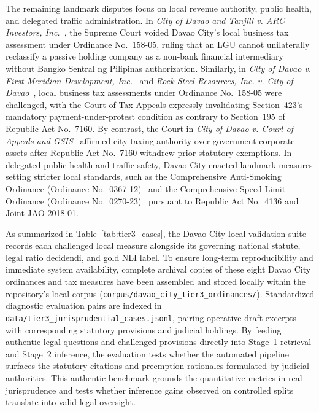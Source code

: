     The remaining landmark disputes focus on local revenue authority, public health, and delegated traffic administration. In \textit{City of Davao and Tanjili v. ARC Investors, Inc.}~\cite{scp2022davaovarc}, the Supreme Court voided Davao City's local business tax assessment under Ordinance No.~158-05, ruling that an LGU cannot unilaterally reclassify a passive holding company as a non-bank financial intermediary without Bangko Sentral ng Pilipinas authorization. Similarly, in \textit{City of Davao v. First Meridian Development, Inc.}~\cite{scp2022firstmeridian} and \textit{Rock Steel Resources, Inc. v. City of Davao}~\cite{ctarocksteel139}, local business tax assessments under Ordinance No.~158-05 were challenged, with the Court of Tax Appeals expressly invalidating Section~423's mandatory payment-under-protest condition as contrary to Section~195 of Republic Act No.~7160. By contrast, the Court in \textit{City of Davao v. Court of Appeals and GSIS}~\cite{scp2005davaovgsis} affirmed city taxing authority over government corporate assets after Republic Act No.~7160 withdrew prior statutory exemptions. In delegated public health and traffic safety, Davao City enacted landmark measures setting stricter local standards, such as the Comprehensive Anti-Smoking Ordinance (Ordinance No.~0367-12)~\cite{spdavao2012ord0367} and the Comprehensive Speed Limit Ordinance (Ordinance No.~0270-23)~\cite{spdavao2023ord0270} pursuant to Republic Act No.~4136 and Joint JAO 2018-01.

    As summarized in Table~\ref{tab:tier3_cases}, the Davao City local validation suite records each challenged local measure alongside its governing national statute, legal ratio decidendi, and gold NLI label. To ensure long-term reproducibility and immediate system availability, complete archival copies of these eight Davao City ordinances and tax measures have been assembled and stored locally within the repository's local corpus (\texttt{corpus/davao\_city\_tier3\_ordinances/}). Standardized diagnostic evaluation pairs are indexed in \texttt{data/tier3\_jurisprudential\_cases.jsonl}, pairing operative draft excerpts with corresponding statutory provisions and judicial holdings. By feeding authentic legal questions and challenged provisions directly into Stage~1 retrieval and Stage~2 inference, the evaluation tests whether the automated pipeline surfaces the statutory citations and preemption rationales formulated by judicial authorities. This authentic benchmark grounds the quantitative metrics in real jurisprudence and tests whether inference gains observed on controlled splits translate into valid legal oversight.

